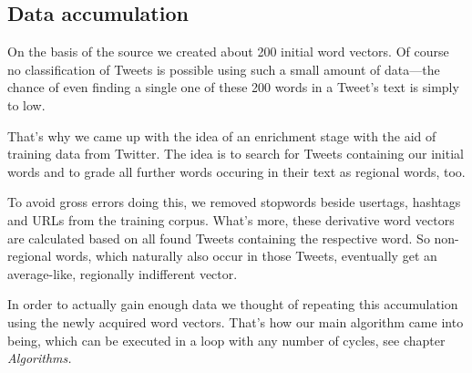 \documentclass[../Main.tex]{subfiles}
\begin{document}
\subsection{Data accumulation}
On the basis of the source we created about 200 initial word vectors. Of course no classification of Tweets is possible using such a small amount of data---the chance of even finding a single one of these 200 words in a Tweet's text is simply to low.

That's why we came up with the idea of an enrichment stage with the aid of training data from Twitter. The idea is to search for Tweets containing our initial words and to grade all further words occuring in their text as regional words, too.

To avoid gross errors doing this, we removed stopwords beside usertags, hashtags and URLs from the training corpus. What's more, these derivative word vectors are calculated based on all found Tweets containing the respective word. So non-regional words, which naturally also occur in those Tweets, eventually get an average-like, regionally indifferent vector.

In order to actually gain enough data we thought of repeating this accumulation using the newly acquired word vectors. That's how our main algorithm came into being, which can be executed in a loop with any number of cycles, see chapter \textit{Algorithms.}
\end{document}
